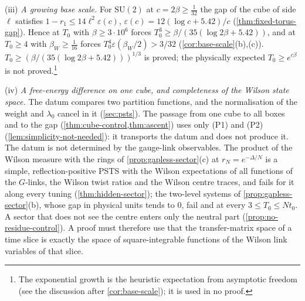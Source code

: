 \documentclass[11pt,a4paper]{amsart}
\theoremstyle{definition}
\theoremstyle{remark}
\numberwithin{equation}{section}
\newcommand{\SU}{\mathrm{SU}}              %
\newcommand{\PSTS}{\textup{PSTS}}          %
\newcommand{\lzero}{\lambda_0}             %
\newcommand{\Mcirc}{\text{\upshape(M$^{\circ}$)}}   %
\newcommand{\Bcirc}{\text{\upshape(B$^{\circ}$)}}   %
\newcommand{\Bstar}{\text{\upshape(B$^{*}$)}}       %
\newcommand{\tzero}{t_0}                   %
\newcommand{\betaW}{\beta_{W}}             %
\begin{document}
(iii) \emph{A growing base scale.} For $\SU(2)$ at $c=2\beta\ge\frac1{32}$ the gap of the cube of side $\ell$ satisfies $1-r_1\le14\ell^2\varepsilon(c)$, $\varepsilon(c)=12(\log c+5.42)/c$ (\cref{thm:fixed-torus-gap}). Hence \Bstar{} at $T_0$ with $\beta\ge3\cdot10^6$ forces $T_0^3\ge\beta/(35(\log2\beta+5.42))$, and \Bcirc{} at $T_0\ge4$ with $\betaW\ge\frac1{16}$ forces $T_0^4\varepsilon(\betaW/2)>3/32$ (\cref{cor:base-scale}(b),(c)). $T_0\ge(\beta/(35(\log2\beta+5.42)))^{1/3}$ is proved; the physically expected $T_0\ge e^{c\beta}$ is not proved.\footnote{The exponential growth is the heuristic expectation from asymptotic freedom (see the discussion after \cref{cor:base-scale}); it is used in no proof.}

(iv) \emph{A free-energy difference on one cube, and completeness of the Wilson state space.} The datum compares two partition functions, and the normalisation of the weight and $\lzero$ cancel in it (\cref{sec:psts}). The passage from one cube to all boxes and to the gap (\cref{thm:cube-control,thm:ascent}) uses only (P1) and (P2) (\cref{lem:simplicity-not-needed}): it transports the datum and does not produce it. The datum is not determined by the gauge-link observables. The product of the Wilson measure with the rings of \cref{prop:gapless-sector}(c) at $r_N=e^{-\Delta/N}$ is a simple, reflection-positive \PSTS{} with the Wilson expectations of all functions of the $G$-links, the Wilson twist ratios and the Wilson centre traces, and \Mcirc{} fails for it along every tuning (\cref{thm:hidden-sector}); the two-level systems of \cref{prop:gapless-sector}(b), whose gap in physical units tends to $0$, fail \Bcirc{} and \Mcirc{} at every $3\le T_0\le N\tzero$. A sector that does not see the centre enters only the neutral part (\cref{prop:no-residue-control}). A proof must therefore use that the transfer-matrix space of a time slice is exactly the space of square-integrable functions of the Wilson link variables of that slice.
\end{document}
